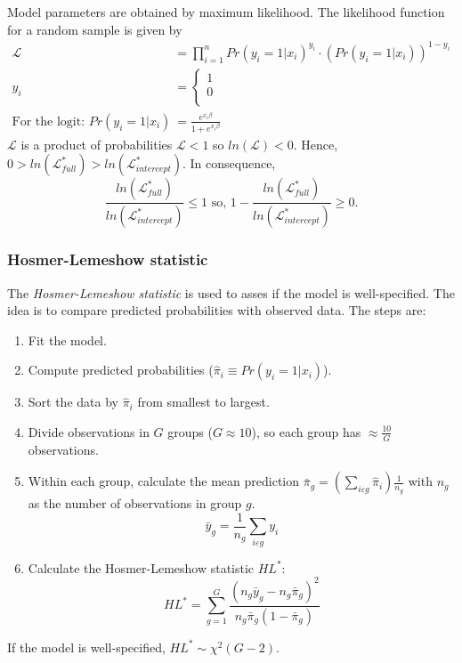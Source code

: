 		 Model parameters are obtained by maximum likelihood. The likelihood function for a random sample is given by
		 \begin{align*}
		 	\mathcal{L}&=\prod_{i=1}^{n} Pr(y_i=1|x_i)^{y_i}\cdot (Pr(y_i=1|x_i))^{1-y_i}\\
		 	y_i&=\begin{cases}
			 	1\\0\\
		 	\end{cases}\\
		 	\text{For the logit: }Pr(y_i=1|x_i)&=\frac{e^{x_i \beta}}{1+e^{x_i \beta}}
		 \end{align*}
		 $\mathcal{L}$ is a product of probabilities $\mathcal{L} < 1$ so $ln(\mathcal{L})< 0$. Hence, $0>ln(\mathcal{L}^*_{full})>ln(\mathcal{L}^*_{intercept})$. In consequence,
		 \begin{equation*}
		 	\frac{ln(\mathcal{L}^*_{full})}{ln(\mathcal{L}^*_{intercept})}\leq 1\text{ so, }1-\frac{ln(\mathcal{L}^*_{full})}{ln(\mathcal{L}^*_{intercept})}\geq 0.
		 \end{equation*}
	\subsubsection{Hosmer-Lemeshow statistic}
		The \emph{Hosmer-Lemeshow statistic} is used to asses if the model is well-specified. The idea is to compare predicted probabilities with observed data. The steps are:
		\begin{enumerate}
			\item Fit the model.
			\item Compute predicted probabilities ($\hat{\pi}_i \equiv Pr(y_i=1|x_i)$).
			\item Sort the data by $\hat{\pi}_i$ from smallest to largest.
			\item Divide observations in $G$ groups ($G\approx 10$), so each group has $\approx \frac{10}{G}$ observations.
			\item Within each group, calculate the mean prediction $\bar{\pi}_g=\left(\sum\limits_{i\varepsilon g} \hat{\pi}_i \right) \frac{1}{n_g}$ with $n_g$ as the number of observations in group $g$.
			\begin{equation*}
				\bar{y}_g=\frac{1}{n_g} \sum\limits_{i\varepsilon g} y_i
			\end{equation*}
			\item Calculate the Hosmer-Lemeshow statistic $HL^*$:
			\begin{equation*}
				HL^*=\sum\limits^{G}_{g=1}\frac{(n_g \bar{y}_g - n_g \bar{\pi}_g)^2}{n_g \bar{\pi}_g (1-\bar{\pi}_g)}
			\end{equation*}
		\end{enumerate}
		If the model is well-specified, $HL^*\sim\chi^2(G-2)$. %
